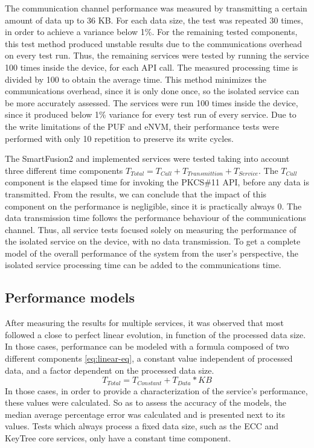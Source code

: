 The communication channel performance was measured by transmitting a certain amount of data up to 36 KB. For each data size, the test was repeated 30 times, in order to achieve a variance below 1\%.
For the remaining tested components, this test method produced unstable results due to the communications overhead on every test run.
Thus, the remaining services were tested by running the service 100 times inside the device, for each API call. The measured processing time is divided by 100 to obtain the average time. This method minimizes the communications overhead, since it is only done once, so the isolated service can be more accurately assessed.
The services were run 100 times inside the device, since it produced below 1\% variance for every test run of every service.
Due to the write limitations of the PUF and eNVM, their performance tests were performed with only 10 repetition to preserve its write cycles.

The SmartFusion2 and implemented services were tested taking into account three different time components \(T_{Total} = T_{Call} + T_{Transmittion} + T_{Service}\). The \(T_{Call}\) component is the elapsed time for invoking the PKCS\#11 API, before any data is transmitted. From the results, we can conclude that the impact of this component on the performance is negligible, since it is practically always 0.
The data transmission time follows the performance behaviour of the communications channel.
Thus, all service tests focused solely on measuring the performance of the isolated service on the device, with no data transmission. To get a complete model of the overall performance of the system from the user's perspective, the isolated service processing time can be added to the communications time.

\subsection{Performance models}\label{chap:evaluation:performance:models}

After measuring the results for multiple services, it was observed that most followed a close to perfect linear evolution, in function of the processed data size. In those cases, performance can be modeled with a formula composed of two different components \ref{eq:linear-eq}, a constant value independent of processed data, and a factor dependent on the processed data size.
\begin{equation}
	\label{eq:linear-eq}
	T_{Total} = T_{Constant} + T_{Data} * KB
\end{equation}
In those cases, in order to provide a characterization of the service's performance, these values were calculated.
So as to assess the accuracy of the models, the median average percentage error was calculated and is presented next to its values. Tests which always process a fixed data size, such as the ECC and KeyTree core services, only have a constant time component.

